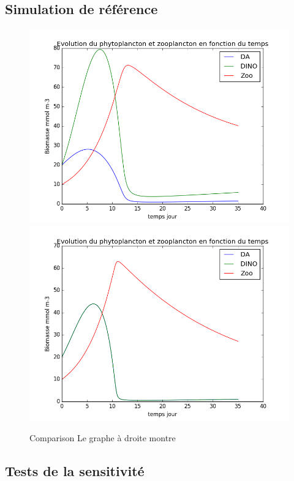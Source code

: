 \subsection{Simulation de référence}

\begin{figure}
  \includegraphics[width=.5\textwidth]{partie2/1Selec.png}\hfill
  \includegraphics[width=.5\textwidth]{partie2/1Nonselec.png}
  \caption{Comparison 
Le graphe à droite montre \todo}
  \label{fig:partie2Ref}
\end{figure}

\subsection{Tests de la sensitivité}

